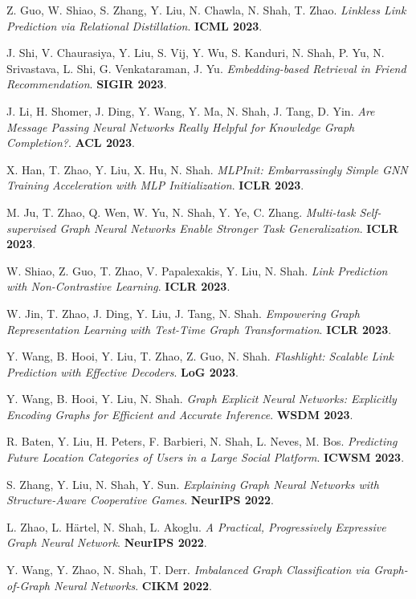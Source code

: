 \documentclass{article}
\begin{document}
\begin{etaremune}[itemsep=1pt,parsep=0pt]
\item Z. Guo, W. Shiao, S. Zhang, Y. Liu, N. Chawla, N. Shah, T. Zhao. \emph{Linkless Link Prediction via Relational Distillation}. \textbf{ICML 2023}.
\item J. Shi, V. Chaurasiya, Y. Liu, S. Vij, Y. Wu, S. Kanduri, N. Shah, P. Yu, N. Srivastava, L. Shi, G. Venkataraman, J. Yu. \emph{Embedding-based Retrieval in Friend Recommendation}. \textbf{SIGIR 2023}.
\item J. Li, H. Shomer, J. Ding, Y. Wang, Y. Ma, N. Shah, J. Tang, D. Yin. \emph{Are Message Passing Neural Networks Really Helpful for Knowledge Graph Completion?}. \textbf{ACL 2023}.
\item X. Han, T. Zhao, Y. Liu, X. Hu, N. Shah. \emph{MLPInit: Embarrassingly Simple GNN Training Acceleration with MLP Initialization}. \textbf{ICLR 2023}.
\item M. Ju, T. Zhao, Q. Wen, W. Yu, N. Shah, Y. Ye, C. Zhang. \emph{Multi-task Self-supervised Graph Neural Networks Enable Stronger Task Generalization}. \textbf{ICLR 2023}.
\item W. Shiao, Z. Guo, T. Zhao, V. Papalexakis, Y. Liu, N. Shah. \emph{Link Prediction with Non-Contrastive Learning}. \textbf{ICLR 2023}.
\item W. Jin, T. Zhao, J. Ding, Y. Liu, J. Tang, N. Shah. \emph{Empowering Graph Representation Learning with Test-Time Graph Transformation}. \textbf{ICLR 2023}.
\item Y. Wang, B. Hooi, Y. Liu, T. Zhao, Z. Guo, N. Shah. \emph{Flashlight: Scalable Link Prediction with Effective Decoders}. \textbf{LoG 2023}.
\item Y. Wang, B. Hooi, Y. Liu, N. Shah. \emph{Graph Explicit Neural Networks: Explicitly Encoding Graphs for Efficient and Accurate Inference}. \textbf{WSDM 2023}.
\item R. Baten, Y. Liu, H. Peters, F. Barbieri, N. Shah, L. Neves, M. Bos. \emph{Predicting Future Location Categories of Users in a Large Social Platform}. \textbf{ICWSM 2023}.
\item S. Zhang, Y. Liu, N. Shah, Y. Sun. \emph{Explaining Graph Neural Networks with Structure-Aware Cooperative Games}. \textbf{NeurIPS 2022}.
\item L. Zhao, L. Härtel, N. Shah, L. Akoglu. \emph{A Practical, Progressively Expressive Graph Neural Network}. \textbf{NeurIPS 2022}.
\item Y. Wang, Y. Zhao, N. Shah, T. Derr. \emph{Imbalanced Graph Classification via Graph-of-Graph Neural Networks}. \textbf{CIKM 2022}.

\end{etaremune}
\end{document}
